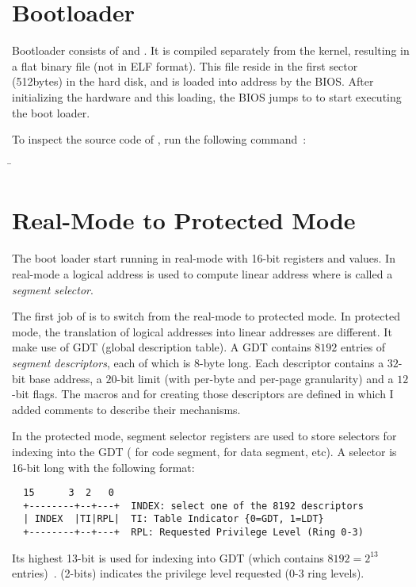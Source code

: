 \documentclass{article}
\begin{document}
\section{Bootloader}

Bootloader consists of  and . It is
compiled separately from the kernel, resulting in a flat binary file
 (not in ELF format). This file reside in the first
sector (512bytes) in the hard disk, and is loaded into address
\code{[0x7c00 - 0x7dff]} by the BIOS. After initializing the hardware
and this loading, the BIOS jumps to  to start executing
the boot loader.

To inspect the source code of , run the following command~\cite{disasm-flat}:

\begin{tabbing}
  \qquad\=\kill
  \> 
\end{tabbing}

\section{Real-Mode to Protected Mode}

The boot loader start running in real-mode with 16-bit registers and
values. In real-mode a logical address  is used
to compute linear address  where
 is called a \emph{segment selector}.

The first job of  is to switch from the real-mode to
protected mode. In protected mode, the translation of logical
addresses into linear addresses are different. It make use of GDT
(global description table). A GDT contains $8192$ entries of
\emph{segment descriptors}, each of which is 8-byte long. Each
descriptor contains a $32$-bit base address, a $20$-bit limit (with
per-byte and per-page granularity) and a $12$-bit flags. The macros
 and  for creating those descriptors
are defined in  which I added comments to describe their
mechanisms.

In the protected mode, segment selector registers are used to store
selectors for indexing into the GDT ( for code segment,
 for data segment, etc). A selector is 16-bit long with the
following format:
%
\begin{verbatim}
  15      3  2   0 
  +--------+--+---+  INDEX: select one of the 8192 descriptors
  | INDEX  |TI|RPL|  TI: Table Indicator {0=GDT, 1=LDT}
  +--------+--+---+  RPL: Requested Privilege Level (Ring 0-3)
\end{verbatim}
%
Its highest 13-bit is used for indexing into GDT (which contains
$8192 = 2^{13}$ entries)~\cite{jasoncc-mem}.  (2-bits)
indicates the privilege level requested (0-3 ring levels).
\end{document}
